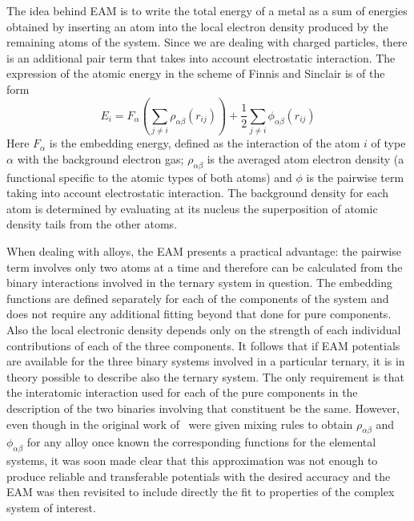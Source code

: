 The idea behind EAM is to write the total energy of a metal as a sum of energies obtained by inserting an atom into the local electron density produced by the remaining atoms of the system. Since we are dealing with charged particles, there is an additional pair term that takes into account electrostatic interaction. The expression of the atomic energy in the scheme of Finnis and Sinclair is of the form
\begin{equation}
    \label{eqn:EAM1}
    E_i= F_\alpha\left(\sum_{j\neq i} \rho_{\alpha\beta} (r_{ij}) \right) + \frac{1}{2} \sum_{j\neq i} \phi_{\alpha\beta}(r_{ij})
\end{equation}
Here $F_\alpha$ is the embedding energy, defined as the interaction of the atom $i$ of type $\alpha$ with the background electron gas; $\rho_{\alpha\beta}$ is the averaged atom electron density (a functional specific to the atomic types of both atoms) and $\phi$ is the pairwise term taking into account electrostatic interaction. The background density for each atom is determined by evaluating at its nucleus the superposition of atomic density tails from the other atoms.

When dealing with alloys, the EAM presents a practical advantage: the pairwise term involves only two atoms at a time and therefore can be calculated from the binary interactions involved in the ternary system in question. The embedding functions are defined separately for each of the components of the system and does not require any additional fitting beyond that done for pure components. Also the local electronic density depends only on the strength of each individual contributions of each of the three components. It follows that if EAM potentials are available for the three binary systems involved in a particular ternary, it is in theory possible to describe also the ternary system. The only requirement is that the interatomic interaction used for each of the pure components in the description of the two binaries involving that constituent be the same. However, even though in the original work of~\textcite{Daw1984EAM} were given mixing rules to obtain $\rho_{\alpha\beta}$ and $\phi_{\alpha\beta}$ for any alloy once known the corresponding functions for the elemental systems, it was soon made clear that this approximation was not enough to produce reliable and transferable potentials with the desired accuracy and the EAM was then revisited to include directly the fit to properties of the complex system of interest.

